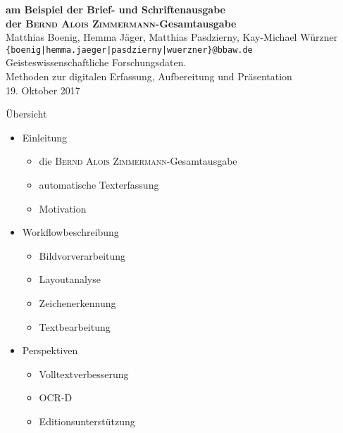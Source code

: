 \documentclass{bbawslides}
\begin{document}
\providecommand{\Title}{}


\begin{bbawtitle}
  \vspace*{0.5em}%
  \textcolor{bbawred}{\bf am Beispiel der Brief- und Schriftenausgabe\\der \textsc{Bernd Alois Zimmermann}-Gesamtausgabe}\\[4ex]
  Matthias Boenig, Hemma Jäger, Matthias Pasdzierny, Kay-Michael Würzner\\[-.25em]%
  \textcolor{urlColor}{\texttt{{\small \{boenig|hemma.jaeger|pasdzierny|wuerzner\}@bbaw.de}}}
  \\[1.5em]
  {\scriptsize{%
    Geisteswissenschaftliche Forschungsdaten.\\Methoden zur digitalen Erfassung, Aufbereitung und Präsentation\\%
    19. Oktober 2017\\%
  }}
\end{bbawtitle}
\slideStyleFrame

\renewcommand{\footerText}{\tiny 19. Oktober 2017, Workshop AG eHumanities}

\begin{bbawslide}{Übersicht}
  \vspace*{7mm}%
  \centerslidestrue%
  \begin{itemize}
    \item Einleitung
    \begin{itemize}\small
      \item die \textsc{Bernd Alois Zimmermann}-Gesamtausgabe
      \item automatische Texterfassung
      \item Motivation
    \end{itemize}
    \item Workflowbeschreibung
    \begin{itemize}\small
      \item Bildvorverarbeitung
      \item Layoutanalyse
      \item Zeichenerkennung
      \item Textbearbeitung
    \end{itemize}
    \item Perspektiven
    \begin{itemize}\small
      \item Volltextverbesserung
      \item OCR-D
      \item Editionsunterstützung
    \end{itemize}
  \end{itemize}
\end{bbawslide}
\end{document}
